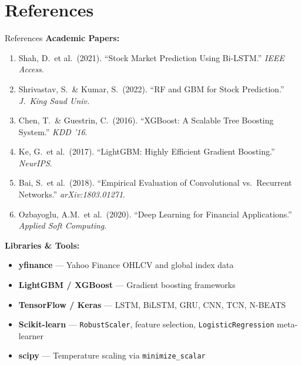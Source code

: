 \documentclass[aspectratio=43,11pt]{beamer}
\begin{document}
\section*{References}

\begin{frame}{References}
    \footnotesize
    \textbf{Academic Papers:}
    \begin{enumerate}\setlength{\itemsep}{2pt}
        \item Shah, D.\ et al.\ (2021). ``Stock Market Prediction Using Bi-LSTM.'' \textit{IEEE Access}.
        \item Shrivastav, S.\ \& Kumar, S.\ (2022). ``RF and GBM for Stock Prediction.'' \textit{J.\ King Saud Univ.}
        \item Chen, T.\ \& Guestrin, C.\ (2016). ``XGBoost: A Scalable Tree Boosting System.'' \textit{KDD '16}.
        \item Ke, G.\ et al.\ (2017). ``LightGBM: Highly Efficient Gradient Boosting.'' \textit{NeurIPS}.
        \item Bai, S.\ et al.\ (2018). ``Empirical Evaluation of Convolutional vs.\ Recurrent Networks.'' \textit{arXiv:1803.01271}.
        \item Ozbayoglu, A.M.\ et al.\ (2020). ``Deep Learning for Financial Applications.'' \textit{Applied Soft Computing}.
    \end{enumerate}
    \vspace{0.2cm}
    \textbf{Libraries \& Tools:}
    \begin{itemize}\setlength{\itemsep}{2pt}
        \item \textbf{yfinance} --- Yahoo Finance OHLCV and global index data
        \item \textbf{LightGBM / XGBoost} --- Gradient boosting frameworks
        \item \textbf{TensorFlow / Keras} --- LSTM, BiLSTM, GRU, CNN, TCN, N-BEATS
        \item \textbf{Scikit-learn} --- \texttt{RobustScaler}, feature selection, \texttt{LogisticRegression} meta-learner
        \item \textbf{scipy} --- Temperature scaling via \texttt{minimize\_scalar}
    \end{itemize}
\end{frame}
\end{document}
